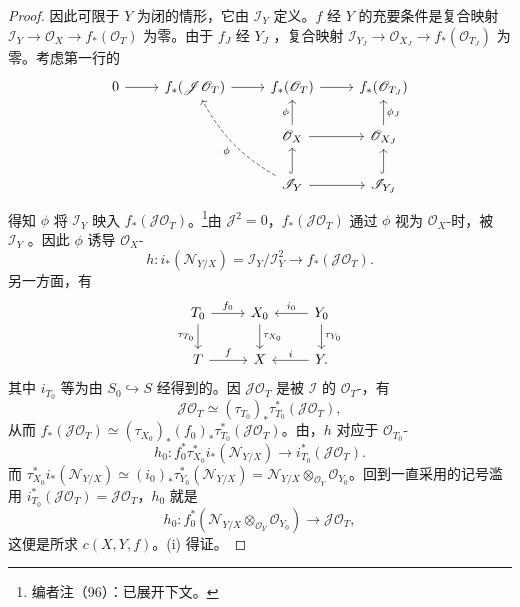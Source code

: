 \begin{proof}
因此可限于 $Y$ 为闭的情形，它由 $\mathscr I_Y$ 定义。$f$ 经 $Y$ 的充要条件是复合映射 $\mathscr I_Y\to\mathscr O_X\to f_*(\mathscr O_T)$ 为零。由于 $f_J$ 经 $Y_J$ ，复合映射 $\mathscr I_{Y_J}\to\mathscr O_{X_J}\to f_*(\mathscr O_{T_J})$ 为零。考虑第一行的
\[
\begin{tikzcd}
0\arrow[r]&f_*(\mathscr J\mathscr O_T)\arrow[r]&f_*(\mathscr O_T)\arrow[r]&f_*(\mathscr O_{T_J})\\
&&\mathscr O_X\arrow[u,"\phi"]\arrow[r]&\mathscr O_{X_J}\arrow[u,"\phi_J"']\\
&&\mathscr I_Y\arrow[u,hook]\arrow[r]\arrow[uul,dashed,"\phi",bend left=15]&\mathscr I_{Y_J}\arrow[u,hook]
\end{tikzcd}
\]
得知 $\phi$ 将 $\mathscr I_Y$ 映入 $f_*(\mathscr J\mathscr O_T)$。\footnote{编者注（96）：已展开下文。}由 $\mathscr J^2=0$，$f_*(\mathscr J\mathscr O_T)$ 通过 $\phi$ 视为 $\mathscr O_X$-时，被 $\mathscr I_Y$ 。因此 $\phi$ 诱导 $\mathscr O_X$-
\[h:i_*(\mathscr N_{Y/X})=\mathscr I_Y/\mathscr I_Y^2\longrightarrow f_*(\mathscr J\mathscr O_T).\]
另一方面，有
\[
\begin{tikzcd}
T_0\arrow[r,"f_0"]\arrow[d,"\tau_{T_0}"']&X_0\arrow[d,"\tau_{X_0}"]&Y_0\arrow[l,"i_0"']\arrow[d,"\tau_{Y_0}"]\\
T\arrow[r,"f"]&X&Y\arrow[l,"i"'].
\end{tikzcd}
\]
其中 $i_{T_0}$ 等为由 $S_0\hookrightarrow S$ 经得到的。因 $\mathscr J\mathscr O_T$ 是被 $\mathscr I$ 的 $\mathscr O_T$-，有
\[\mathscr J\mathscr O_T\simeq(\tau_{T_0})_*\tau_{T_0}^*(\mathscr J\mathscr O_T),\]
从而 $f_*(\mathscr J\mathscr O_T)\simeq(\tau_{X_0})_*(f_0)_*\tau_{T_0}^*(\mathscr J\mathscr O_T)$。由，$h$ 对应于 $\mathscr O_{T_0}$-
\[h_0:f_0^*\tau_{X_0}^*i_*(\mathscr N_{Y/X})\longrightarrow i_{T_0}^*(\mathscr J\mathscr O_T).\]
而 $\tau_{X_0}^*i_*(\mathscr N_{Y/X})\simeq(i_0)_*\tau_{Y_0}^*(\mathscr N_{Y/X})=\mathscr N_{Y/X}\otimes_{\mathscr O_Y}\mathscr O_{Y_0}$。回到一直采用的记号滥用 $i_{T_0}^*(\mathscr J\mathscr O_T)=\mathscr J\mathscr O_T$，$h_0$ 就是
\[h_0:f_0^*(\mathscr N_{Y/X}\otimes_{\mathscr O_Y}\mathscr O_{Y_0})\longrightarrow\mathscr J\mathscr O_T,\]
这便是所求 $c(X,Y,f)$。(i) 得证。


\end{proof}
